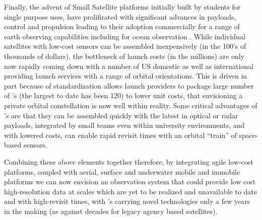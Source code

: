 Finally, the advent of Small Satellite platforms initially built by
students for single purpose uses, have prolifirated with significant
advances in payloads, control and propulsion leading to their adoption
commercially for a range of earth observing capabilities including for
ocean observation \cite{}. While individual satellites with low-cost
sensors can be assembled inexpensively (in the 100's of thousands of
dollars), the bottleneck of launch costs (in the millions) are only
now rapidly coming down with a number of US domestic as well as
international providing launch services with a range of orbital
orientations. This is driven in part because of standardization allows
launch providers to package large number of \smle's (the largest to
date has been 120) to lower unit costs, that envisioning a private
orbital constellation is now well within reality. Some critical
advantages of \smle's are that they can be assembled quickly with the
latest in optical or radar payloads, integrated by small teams even
within university environments, and with lowered costs, can enable
rapid revisit times with an orbital ``train'' of space-based sensors. 

Combining these above elements together therefore, by integrating
agile low‐cost \sml platforms, coupled with aerial, surface and
underwater mobile and immobile platforms we can now envision an
observation system that could provide low cost high‐resolution data at
scales which are yet to be realized and unavailable to date and with
high-revisit times, with \smle's carrying novel technologies only a
few years in the making (as against decades for legacy agency based
satellites).
